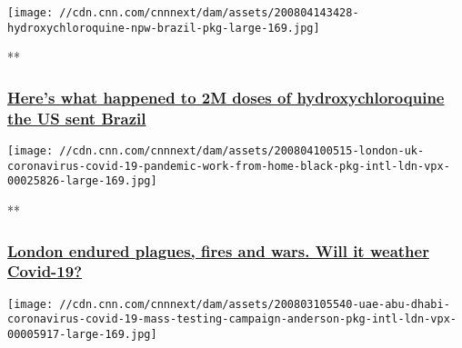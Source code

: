\href{/videos/world/2020/08/04/brazil-coronavirus-covid-19-pandemic-jair-bolsonaro-donald-trump-hydroxychloroquine-npw-intl-ldn-vpx.cnn/video/playlists/coronavirus-intl/}{}

\texttt{[image: //cdn.cnn.com/cnnnext/dam/assets/200804143428-hydroxychloroquine-npw-brazil-pkg-large-169.jpg]}

**

\hypertarget{heres-what-happened-to-2m-doses-of-hydroxychloroquine-the-us-sent-brazil}{%
\subsubsection{\texorpdfstring{\href{/videos/world/2020/08/04/brazil-coronavirus-covid-19-pandemic-jair-bolsonaro-donald-trump-hydroxychloroquine-npw-intl-ldn-vpx.cnn/video/playlists/coronavirus-intl/}{Here's
what happened to 2M doses of hydroxychloroquine the US sent
Brazil}}{Here's what happened to 2M doses of hydroxychloroquine the US sent Brazil}}\label{heres-what-happened-to-2m-doses-of-hydroxychloroquine-the-us-sent-brazil}}

\href{/videos/world/2020/08/04/london-uk-coronavirus-covid-19-pandemic-work-from-home-black-pkg-intl-ldn-vpx.cnn/video/playlists/coronavirus-intl/}{}

\texttt{[image: //cdn.cnn.com/cnnnext/dam/assets/200804100515-london-uk-coronavirus-covid-19-pandemic-work-from-home-black-pkg-intl-ldn-vpx-00025826-large-169.jpg]}

**

\hypertarget{london-endured-plagues-fires-and-wars-will-it-weather-covid-19}{%
\subsubsection{\texorpdfstring{\href{/videos/world/2020/08/04/london-uk-coronavirus-covid-19-pandemic-work-from-home-black-pkg-intl-ldn-vpx.cnn/video/playlists/coronavirus-intl/}{London
endured plagues, fires and wars. Will it weather
Covid-19?}}{London endured plagues, fires and wars. Will it weather Covid-19?}}\label{london-endured-plagues-fires-and-wars-will-it-weather-covid-19}}

\href{/videos/world/2020/08/03/uae-abu-dhabi-coronavirus-covid-19-mass-testing-campaign-anderson-pkg-intl-ldn-vpx.cnn/video/playlists/coronavirus-intl/}{}

\texttt{[image: //cdn.cnn.com/cnnnext/dam/assets/200803105540-uae-abu-dhabi-coronavirus-covid-19-mass-testing-campaign-anderson-pkg-intl-ldn-vpx-00005917-large-169.jpg]}

